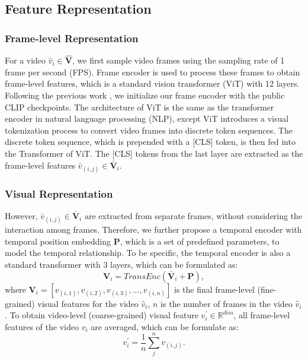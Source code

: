 \documentclass[sigconf]{acmart}
\begin{document}
\subsection{Feature Representation} \label{sec:feature}

\subsubsection{Frame-level Representation}
For a video $\hat{v}_i \in \mathbf{\hat{V}}$, we first sample video frames using the sampling rate of 1 frame per second (FPS). Frame encoder is used to process these frames to obtain frame-level features, which is a standard vision transformer (ViT) with 12 layers. Following the previous work \cite{luo2021clip4clip}, we initialize our frame encoder with the public CLIP \cite{radford2021learning} checkpoints. The architecture of ViT is the same as the transformer \cite{vaswani2017attention} encoder in natural language processing (NLP), except ViT introduces a visual tokenization process to convert video frames into discrete token sequences. The discrete token sequence, which is prepended with a [CLS] token, is then fed into the Transformer of ViT. The [CLS] tokens from the last layer are extracted as the frame-level features $\bar{v}_{(i,j)} \in \mathbf{\bar{V}}_i$. 

\subsubsection{Visual Representation}
However, $\bar{v}_{(i,j)} \in \mathbf{\bar{V}}_i$ are extracted from separate frames, without considering the interaction among frames. Therefore, we further propose a temporal encoder with temporal position embedding $\mathbf{P}$, which is a set of predefined parameters, to model the temporal relationship. To be specific, the temporal encoder is also a standard transformer with 3 layers, which can be formulated as:
\begin{equation}
    \mathbf{V}_i=TransEnc\left(\mathbf{\bar{V}}_i + \mathbf{P}\right),
\label{eq:trans}
\end{equation}
where $\mathbf{V}_i=[v_{(i,1)},v_{(i,2)},v_{(i,3)},...,v_{(i,n)}]$ is the final frame-level (fine-grained) visual features for the video $\hat{v}_i$, $n$ is the number of frames in the video $\hat{v}_i$. To obtain video-level (coarse-grained) visual feature $v^{\prime}_i \in \mathbb{R}^{dim}$, all frame-level features of the video  ${v}_i $ are averaged, which can be formulate as:
\begin{equation}
    v^{\prime}_i=\frac{1}{n}\sum_j^n v_{(i,j)}.
\label{eq:trans}
\end{equation}
\end{document}
